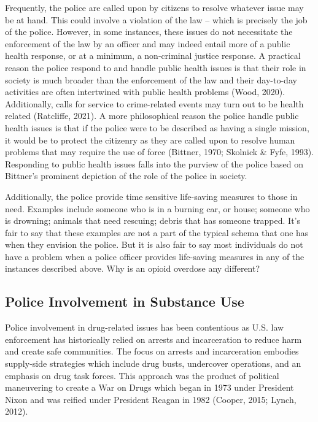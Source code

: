 Frequently, the police are called upon by citizens to resolve whatever issue may be at hand. This could involve a violation of the law – which is precisely the job of the police. However, in some instances, these issues do not necessitate the enforcement of the law by an officer and may indeed entail more of a public health response, or at a minimum, a non-criminal justice response. A practical reason the police respond to and handle public health issues is that their role in society is much broader than the enforcement of the law and their day-to-day activities are often intertwined with public health problems (Wood, 2020). Additionally, calls for service to crime-related events may turn out to be health related (Ratcliffe, 2021). A more philosophical reason the police handle public health issues is that if the police were to be described as having a single mission, it would be to protect the citizenry as they are called upon to resolve human problems that may require the use of force (Bittner, 1970; Skolnick & Fyfe, 1993). Responding to public health issues falls into the purview of the police based on Bittner’s prominent depiction of the role of the police in society.

Additionally, the police provide time sensitive life-saving measures to those in need. Examples include someone who is in a burning car, or house; someone who is drowning; animals that need rescuing; debris that has someone trapped. It's fair to say that these examples are not a part of the typical schema that one has when they envision the police. But it is also fair to say most individuals do not have a problem when a police officer provides life-saving measures in any of the instances described above. Why is an opioid overdose any different?
 
\subsection{Police Involvement in Substance Use}
Police involvement in drug-related issues has been contentious as U.S. law enforcement has historically relied on arrests and incarceration to reduce harm and create safe communities. The focus on arrests and incarceration embodies supply-side strategies which include drug busts, undercover operations, and an emphasis on drug task forces. This approach was the product of political maneuvering to create a War on Drugs which began in 1973 under President Nixon and was reified under President Reagan in 1982 (Cooper, 2015; Lynch, 2012).

